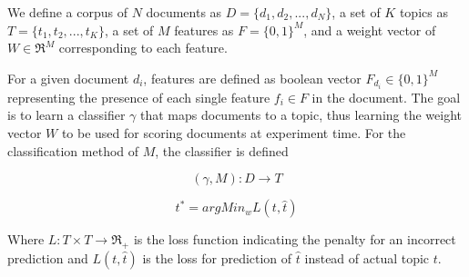 

We define a corpus of $N$ documents as $D = \{{d_{1}}, {d_{2}}, ..., {d_{N}} \}$, a set of $K$ topics as $T = \{{t_{1}}, {t_{2}}, ..., {t_{K}} \}$, a set of $M$ features as $F = \{0,1\}^{M}$, and a weight vector of $W \in \Re^{M}$ corresponding to each feature. 

For a given document ${d_{i}}$, features are defined as boolean vector ${F_{d_{i}}} \in \{0,1\}^{M}$ representing the presence of each single feature ${f_{i}} \in F$ in the document. The goal is to learn a classifier $\gamma$ that maps documents to a topic, thus learning the weight vector $W$ to be used for scoring documents at experiment time. For the classification method of $M$, the classifier is defined

\begin{equation}
(\gamma, M) : D \to T 
\end{equation}

\begin{equation}
t^{*} = argMin_{w} L(t,\hat{t})
\end{equation}

Where ${L : T \times T \to \Re_{+} }$ is the loss function indicating the penalty for an incorrect prediction and ${L(t,\hat{t})}$ is the loss for prediction of ${\hat{t}}$ instead of actual topic $t$.
%
%

